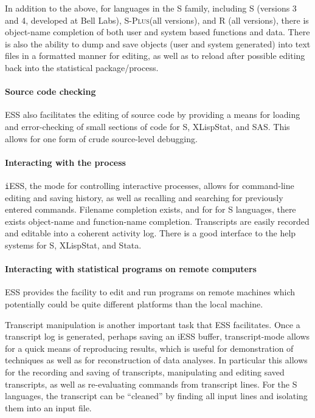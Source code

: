 \documentclass{article}
\newcommand*{\Splus}{\textsc{S-Plus}}
\begin{document}
In addition to the above, for languages in the S family, including S
(versions 3 and 4, developed at Bell Labs), \Splus (all versions), and
R (all versions), there is object-name completion of both user and
system based functions and data.  There is also the ability to dump
and save objects (user and system generated) into text files in a
formatted manner for editing, as well as to reload after possible
editing back into the statistical package/process.

\paragraph{Source code checking}
ESS also facilitates the editing of source code by providing a means
for loading and error-checking of small sections of code for S,
XLispStat, and SAS.  This allows for one form of crude source-level
debugging.

\paragraph{Interacting with the process}
{\texttt iESS}, the mode for controlling interactive processes, allows for
command-line editing and saving history, as well as recalling and
searching for previously entered commands.  Filename completion
exists, and for for S languages, there exists object-name and
function-name completion.  Transcripts are easily recorded and
editable into a coherent activity log.  There is a good interface to
the help systems for S, XLispStat, and Stata.

\paragraph{Interacting with statistical programs on remote computers}
ESS provides the facility to edit and run programs on remote machines
which potentially could be quite different platforms than the local
machine.

Transcript manipulation is another important task that ESS
facilitates.  Once a transcript log is generated, perhaps saving an
iESS buffer, transcript-mode allows for a quick means of reproducing
results, which is useful for demonstration of techniques as well as
for reconstruction of data analyses.  In particular this allows for
the recording and saving of transcripts, manipulating and editing
saved transcripts, as well as re-evaluating commands from transcript
lines.  For the S languages, the transcript can be ``cleaned'' by
finding all input lines and isolating them into an input file.
\end{document}

